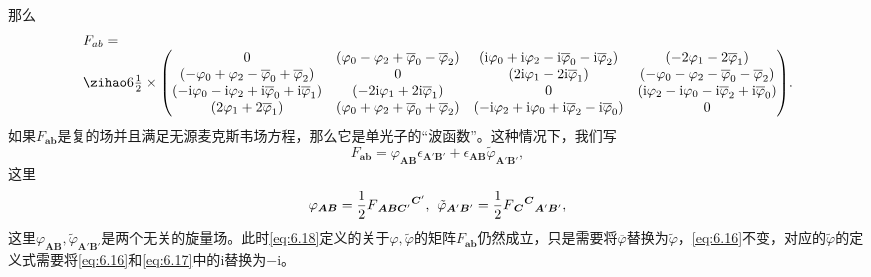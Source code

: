 那么
\begin{equation*}
	\begin{array}{ l }
		F_{ab} = \\
		{\footnotesize \frac{1}{2} \times\begin{pmatrix}
			0 & ( \varphi _{0} -\varphi _{2} +\overline{\varphi }_{0} -\overline{\varphi }_{2}) & (\mathrm{i} \varphi _{0} +\mathrm{i} \varphi _{2} -\mathrm{i}\overline{\varphi }_{0} -\mathrm{i}\overline{\varphi }_{2}) & ( -2\varphi _{1} -2\overline{\varphi }_{1})\\
			( -\varphi _{0} +\varphi _{2} -\overline{\varphi }_{0} +\overline{\varphi }_{2}) & 0 & ( 2\mathrm{i} \varphi _{1} -2\mathrm{i}\overline{\varphi }_{1}) & ( -\varphi _{0} -\varphi _{2} -\overline{\varphi }_{0} -\overline{\varphi }_{2})\\
			( -\mathrm{i} \varphi _{0} -\mathrm{i} \varphi _{2} +\mathrm{i}\overline{\varphi }_{0} +\mathrm{i}\overline{\varphi }_{1}) & ( -2\mathrm{i} \varphi _{1} +2\mathrm{i}\overline{\varphi }_{1}) & 0 & (\mathrm{i} \varphi _{2} -\mathrm{i} \varphi _{0} -\mathrm{i}\overline{\varphi }_{2} +\mathrm{i}\overline{\varphi }_{0})\\
			( 2\varphi _{1} +2\overline{\varphi }_{1}) & ( \varphi _{0} +\varphi _{2} +\overline{\varphi }_{0} +\overline{\varphi }_{2}) & ( -\mathrm{i} \varphi _{2} +\mathrm{i} \varphi _{0} +\mathrm{i}\overline{\varphi }_{2} -\mathrm{i}\overline{\varphi }_{0}) & 0
		\end{pmatrix}} .
	\end{array}
\end{equation*}
如果$F_{\boldsymbol{ab}}$是复的场并且满足无源麦克斯韦场方程，那么它是单光子的“波函数”。这种情况下，我们写
\begin{equation*}
	F_{\boldsymbol{ab}} =\varphi _{\boldsymbol{AB}} \epsilon _{\boldsymbol{A} '\boldsymbol{B} '} +\epsilon _{\boldsymbol{AB}}\tilde{\varphi }_{\boldsymbol{A'B} '} ,
\end{equation*}
这里
\begin{equation*}
	\varphi _{\boldsymbol{AB}} =\frac{1}{2} F{_{\boldsymbol{ABC} '}}^{\boldsymbol{C} '} ,\kern+0.4em \tilde{\varphi }_{\boldsymbol{A} '\boldsymbol{B} '} =\frac{1}{2} F{_{\boldsymbol{C}}}^{\boldsymbol{C}}{}_{\boldsymbol{A} '\boldsymbol{B} '} ,
\end{equation*}
这里$\varphi _{\boldsymbol{AB}} ,\tilde{\varphi }_{\boldsymbol{A'B} '}$是两个无关的旋量场。此时\ref{eq:6.18}定义的关于$\varphi ,\tilde{\varphi }$的矩阵$F_{\boldsymbol{ab}}$仍然成立，只是需要将$\overline{\varphi }$替换为$\tilde{\varphi }$，\ref{eq:6.16}不变，对应的$\tilde{\varphi }$的定义式需要将\ref{eq:6.16}和\ref{eq:6.17}中的$\mathrm{i}$替换为$-\mathrm{i}$。



